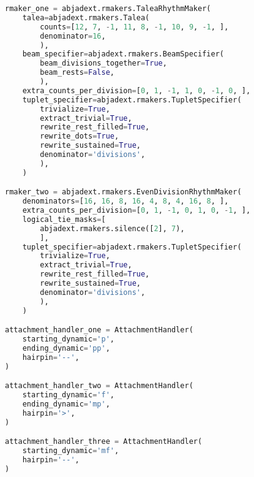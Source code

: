 \begin{lstlisting}[language=Python, caption=Invocation Source Code]
rmaker_one = abjadext.rmakers.TaleaRhythmMaker(
    talea=abjadext.rmakers.Talea(
        counts=[12, 7, -1, 11, 8, -1, 10, 9, -1, ],
        denominator=16,
        ),
    beam_specifier=abjadext.rmakers.BeamSpecifier(
        beam_divisions_together=True,
        beam_rests=False,
        ),
    extra_counts_per_division=[0, 1, -1, 1, 0, -1, 0, ],
    tuplet_specifier=abjadext.rmakers.TupletSpecifier(
        trivialize=True,
        extract_trivial=True,
        rewrite_rest_filled=True,
        rewrite_dots=True,
        rewrite_sustained=True,
        denominator='divisions',
        ),
    )

rmaker_two = abjadext.rmakers.EvenDivisionRhythmMaker(
    denominators=[16, 16, 8, 16, 4, 8, 4, 16, 8, ],
    extra_counts_per_division=[0, 1, -1, 0, 1, 0, -1, ],
    logical_tie_masks=[
        abjadext.rmakers.silence([2], 7),
        ],
    tuplet_specifier=abjadext.rmakers.TupletSpecifier(
        trivialize=True,
        extract_trivial=True,
        rewrite_rest_filled=True,
        rewrite_sustained=True,
        denominator='divisions',
        ),
    )

attachment_handler_one = AttachmentHandler(
    starting_dynamic='p',
    ending_dynamic='pp',
    hairpin='--',
)

attachment_handler_two = AttachmentHandler(
    starting_dynamic='f',
    ending_dynamic='mp',
    hairpin='>',
)

attachment_handler_three = AttachmentHandler(
    starting_dynamic='mf',
    hairpin='--',
)


\end{lstlisting}
